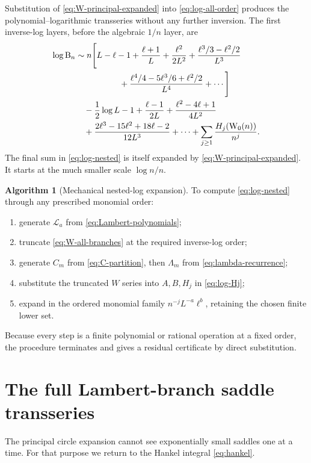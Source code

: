 \documentclass[11pt,a4paper]{article}
\theoremstyle{definition}
\newtheorem{algorithm}[theorem]{Algorithm}
\newcommand{\Bell}{\mathrm B}
\newcommand{\W}{\mathrm W}
\newcommand{\cL}{\mathcal L}
\begin{document}
Substitution of \eqref{eq:W-principal-expanded} into
\eqref{eq:log-all-order} produces the polynomial--logarithmic transseries
without any further inversion.  The first inverse-log layers, before the
algebraic $1/n$ layer, are
\begin{align}
 \log\Bell_n
 &\sim n\Biggl[
 L-\ell-1+\frac{\ell+1}{L}
 +\frac{\ell^2}{2L^2}
 +\frac{\ell^3/3-\ell^2/2}{L^3}\notag\\
 &\hspace{5.2em}{}
 +\frac{\ell^4/4-5\ell^3/6+\ell^2/2}{L^4}
 +\cdots\Biggr]\notag\\
 &\quad-\frac12\log L-1
 +\frac{\ell-1}{2L}
 +\frac{\ell^2-4\ell+1}{4L^2}\notag\\
 &\quad+\frac{2\ell^3-15\ell^2+18\ell-2}{12L^3}
 +\cdots
 +\sum_{j\ge1}\frac{H_j(\W_0(n))}{n^j}.
 \label{eq:log-nested}
\end{align}
The final sum in \eqref{eq:log-nested} is itself expanded by
\eqref{eq:W-principal-expanded}.  It starts at the much smaller scale
$\log n/n$.

\begin{algorithm}[Mechanical nested-log expansion]\label{alg:nested-log}
To compute \eqref{eq:log-nested} through any prescribed monomial order:
\begin{enumerate}
 \item generate $\cL_a$ from \eqref{eq:Lambert-polynomials};
 \item truncate \eqref{eq:W-all-branches} at the required inverse-log order;
 \item generate $C_m$ from \eqref{eq:C-partition}, then $\Lambda_m$ from
       \eqref{eq:lambda-recurrence};
 \item substitute the truncated $W$ series into $A,B,H_j$ in
       \eqref{eq:log-Hj};
 \item expand in the ordered monomial family
       $n^{-j}L^{-a}\ell^b$, retaining the chosen finite lower set.
\end{enumerate}
Because every step is a finite polynomial or rational operation at a fixed
order, the procedure terminates and gives a residual certificate by direct
substitution.
\end{algorithm}

\section{The full Lambert-branch saddle transseries}

The principal circle expansion cannot see exponentially small saddles one at a
time.  For that purpose we return to the Hankel integral \eqref{eq:hankel}.
\end{document}
